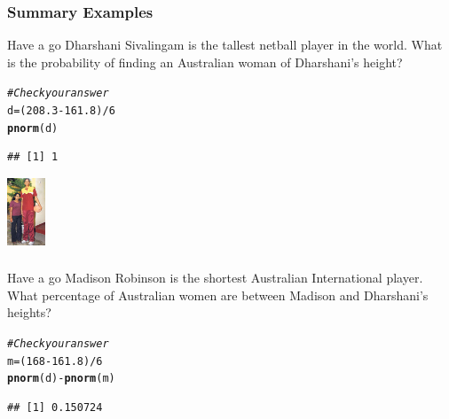 \documentclass[t,xcolor=pdftex,dvipsnames,table]{beamer}
\makeatletter
\newcommand{\hlnum}[1]{\textcolor[rgb]{0.686,0.059,0.569}{#1}}%
\newcommand{\hlcom}[1]{\textcolor[rgb]{0.678,0.584,0.686}{\textit{#1}}}%
\newcommand{\hlopt}[1]{\textcolor[rgb]{0,0,0}{#1}}%
\newcommand{\hlstd}[1]{\textcolor[rgb]{0.345,0.345,0.345}{#1}}%
\newcommand{\hlkwb}[1]{\textcolor[rgb]{0.69,0.353,0.396}{#1}}%
\newcommand{\hlkwd}[1]{\textcolor[rgb]{0.737,0.353,0.396}{\textbf{#1}}}%
\newenvironment{kframe}{%
 \def\at@end@of@kframe{}%
 \ifinner\ifhmode%
  \def\at@end@of@kframe{\end{minipage}}%
  \begin{minipage}{\columnwidth}%
 \fi\fi%
 \def\FrameCommand##1{\hskip\@totalleftmargin \hskip-\fboxsep
 \colorbox{shadecolor}{##1}\hskip-\fboxsep
     \hskip-\linewidth \hskip-\@totalleftmargin \hskip\columnwidth}%
 \MakeFramed {\advance\hsize-\width
   \@totalleftmargin\z@ \linewidth\hsize
   \@setminipage}}%
 {\par\unskip\endMakeFramed%
 \at@end@of@kframe}
\newenvironment{knitrout}{}{} %
\makeatother
\begin{document}
\begin{frame}[fragile]\frametitle{Summary Examples}

\begin{alertblock}{Have a go}
Dharshani Sivalingam is the tallest netball player in the world. What is the probability of finding an Australian woman of Dharshani’s height?

\href{http://www.thetallestman.com/dharshanisivalingam.htm}{}
\end{alertblock}

\begin{knitrout}
\color{fgcolor}\begin{kframe}
\begin{alltt}
\hlcom{#Check your answer}
\hlstd{d}\hlkwb{=}\hlstd{(}\hlnum{208.3} \hlopt{-} \hlnum{161.8}\hlstd{)}\hlopt{/}\hlnum{6}
\hlkwd{pnorm}\hlstd{(d)}
\end{alltt}
\begin{verbatim}
## [1] 1
\end{verbatim}
\end{kframe}
\end{knitrout}

\begin{center}
\includegraphics[height=2cm]{../images/Dharshani.jpg}
\end{center}

\end{frame}

\begin{frame}[fragile]\frametitle{}

\begin{alertblock}{Have a go}
Madison Robinson is the shortest Australian International player. What percentage of Australian women are between Madison and Dharshani’s heights?

\href{https://en.wikipedia.org/wiki/Madison Robinson}{}

\end{alertblock}

\begin{knitrout}
\color{fgcolor}\begin{kframe}
\begin{alltt}
\hlcom{#Check your answer}
\hlstd{m}\hlkwb{=}\hlstd{(}\hlnum{168} \hlopt{-} \hlnum{161.8}\hlstd{)}\hlopt{/}\hlnum{6}
\hlkwd{pnorm}\hlstd{(d)}\hlopt{-}\hlkwd{pnorm}\hlstd{(m)}
\end{alltt}
\begin{verbatim}
## [1] 0.150724
\end{verbatim}
\end{kframe}
\end{knitrout}

\end{frame}
\end{document}
